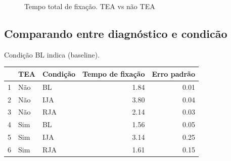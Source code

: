 \documentclass{article}
\begin{document}
\begin{figure}[]
\caption{Tempo total de fixação. TEA vs não TEA}
\noindent{}
\centering
\end{figure}

\subsection{Comparando entre diagnóstico e condicão}

Condição BL indica (baseline).

\begin{table}[ht]
\centering
\begin{tabular}{rllrr}
  \hline
 & TEA & Condição & Tempo de fixação & Erro padrão \\
  \hline
  1 & Não & BL & 1.84 & 0.01 \\
  2 & Não & IJA & 3.80 & 0.04 \\
  3 & Não & RJA & 2.14 & 0.03 \\
  4 & Sim & BL & 1.56 & 0.05 \\
  5 & Sim & IJA & 3.14 & 0.25 \\
  6 & Sim & RJA & 1.61 & 0.15 \\
  \hline
\end{tabular}
\end{table}
\end{document}
